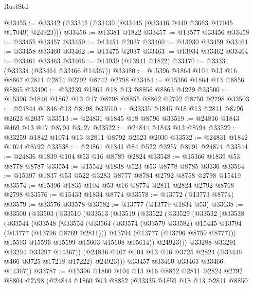 \begin{lexlean}{RustStd}
\begin{coremodule}
@33455 := @33342 (@33345 (@33439 (@33445 (@33446 @440 @3663 @17045 @17049) @24923)))
@33456 := @13381 @1822
@33457 := @13577 @33456
@33458 := @33455 @33457
@33459 := @13451 @2037
@33460 := @13930 @33459
@33461 := @33458 @33460
@33462 := @13475 @2037
@33463 := @13934 @33462
@33464 := @33461 @33463
@33466 := @13939 (@13941 @1822)
@33470 := @33331 (@33334 (@33464 @33466 @14367))
@33480 := @15396 @1864 @104 @13 @16 @8867 @2811 @2824 @2792 @8742 @2798
@33484 := @15366 @1864 @13 @8856 @8865
@33490 := @33239 @1863 @18 @13 @8856 @8863 @4229
@33500 := @15396 @1846 @1862 @13 @17 @8798 @8855 @8862 @2792 @8750 @2798
@33503 := @24844 @1846 @13 @8798
@33510 := @33335 @1845 @18 @13 @2811 @8796 @2623 @2037
@33513 := @24831 @1845 @18 @8796
@33519 := @24836 @1843 @469 @13 @17 @8794 @3727
@33522 := @24844 @1843 @13 @8794
@33529 := @33259 @1842 @1074 @13 @2811 @8792 @2623 @2030
@33532 := @24831 @1842 @1074 @8792
@33538 := @24861 @1841 @84 @522 @3257 @8791 @24874
@33544 := @24836 @1839 @104 @53 @16 @8789 @2824
@33548 := @15366 @1839 @53 @8778 @8787
@33554 := @15542 @1838 @523 @53 @8778 @8785 @3336
@33564 := @15397 @1837 @53 @522 @3283 @8777 @8784 @2792 @8758 @2798 @15419
@33574 := @15396 @1835 @104 @53 @16 @8774 @2811 @2824 @2792 @8768 @2798
@33576 := @15433 @1834 @8774
@33578 := @13772 (@13773 @8774)
@33579 := @33576 @33578
@33582 := @13777 (@13779 @1834 @53)
@33638 := @33500
    (@33503
      (@33510
        (@33513
          (@33519
            (@33522
              (@33529
                (@33532
                  (@33538
                    (@33544
                      (@33548
                        (@33554
                          (@33564
                            (@33574 (@33579 @33582) @15445 @13794 (@13777 (@13796 @8769 @2811)))
                            @13794
                            (@13777 (@13796 @8759 @8777)))
                          @15593
                          @15596
                          @15599
                          @15603
                          @15608
                          @15614))
                      @24923)))
                @33288
                @33291
                @33294
                @33297
                @14367))
            (@24836 @467 @104 @13 @16 @3725 @2824 (@33446 @466 @3725 @17218 @17222) @24923)))
        @33457
        @33460
        @33463
        @33466
        @14367))
@33787 := @15396
    @1860
    @104
    @13
    @16
    @8852
    @2811
    @2824
    @2792
    @8804
    @2798
    (@24844
      @1860
      @13
      @8852
      (@33335
        @1859
        @18
        @13
        @2811
        @8850

\end{coremodule}
\end{lexlean}
